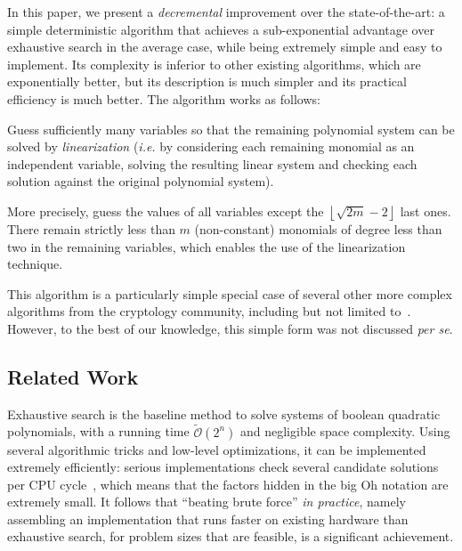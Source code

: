 \documentclass[a4paper,UKenglish,cleveref, autoref]{lipics-v2019}
\newcommand{\bigOsoft}[1]{\ensuremath{\mathcal{\tilde O}\left( #1 \right)} }
\begin{document}
In this paper, we present a \emph{decremental} improvement over the
state-of-the-art: a simple deterministic algorithm that achieves a
sub-exponential advantage over exhaustive search in the average case, while
being extremely simple and easy to implement. Its complexity is inferior to
other existing algorithms, which are exponentially better, but its description
is much simpler and its practical efficiency is much better. The algorithm works
as follows:

\begin{framed}
  Guess sufficiently many variables so that the remaining polynomial system can
  be solved by \emph{linearization} (\textit{i.e.} by considering each remaining
  monomial as an independent variable, solving the resulting linear system and
  checking each solution against the original polynomial system).
\end{framed}

More precisely, guess the values of all variables except the
$\left\lfloor \sqrt{2m} - 2 \right\rfloor$ last ones. There remain strictly
less than $m$ (non-constant) monomials of degree less than two in the remaining
variables, which enables the use of the linearization technique.

This algorithm is a particularly simple special case of several other more
complex algorithms from the cryptology community, including but not limited
to~\cite{CourtoisKPS00,BettaleFP09,JouxV17}. However, to the best of our
knowledge, this simple form was not discussed \textit{per se}.

\subsection{Related Work}
\label{sec:related}

Exhaustive search is the baseline method to solve systems of boolean quadratic
polynomials, with a running time $\bigOsoft{2^n}$ and negligible space
complexity. Using several algorithmic tricks and low-level optimizations, it can
be implemented extremely efficiently: serious implementations check several
candidate solutions per CPU cycle~\cite{BouillaguetCCCNSY10}, which means that
the factors hidden in the big Oh notation are extremely small. It follows that
``beating brute force'' \emph{in practice}, namely assembling an implementation
that runs faster on existing hardware than exhaustive search, for problem sizes
that are feasible, is a significant achievement.
\end{document}
